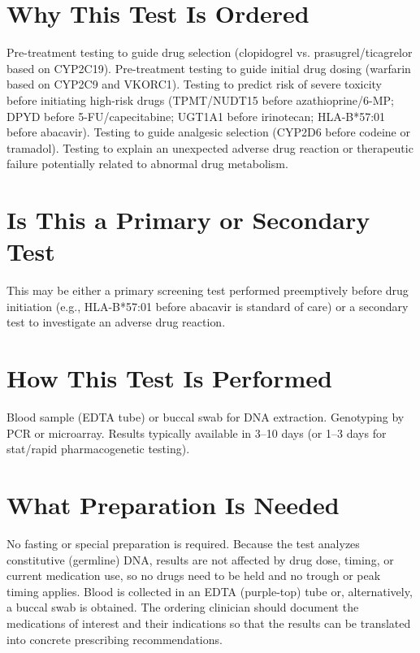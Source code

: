 \section*{Why This Test Is Ordered}
Pre-treatment testing to guide drug selection (clopidogrel vs. prasugrel/ticagrelor based on CYP2C19). Pre-treatment testing to guide initial drug dosing (warfarin based on CYP2C9 and VKORC1). Testing to predict risk of severe toxicity before initiating high-risk drugs (TPMT/NUDT15 before azathioprine/6-MP; DPYD before 5-FU/capecitabine; UGT1A1 before irinotecan; HLA-B*57:01 before abacavir). Testing to guide analgesic selection (CYP2D6 before codeine or tramadol). Testing to explain an unexpected adverse drug reaction or therapeutic failure potentially related to abnormal drug metabolism.

\section*{Is This a Primary or Secondary Test}
This may be either a primary screening test performed preemptively before drug initiation (e.g., HLA-B*57:01 before abacavir is standard of care) or a secondary test to investigate an adverse drug reaction.

\section*{How This Test Is Performed}
Blood sample (EDTA tube) or buccal swab for DNA extraction. Genotyping by PCR or microarray. Results typically available in 3--10 days (or 1--3 days for stat/rapid pharmacogenetic testing).

\section*{What Preparation Is Needed}
No fasting or special preparation is required. Because the test analyzes constitutive (germline) DNA, results are not affected by drug dose, timing, or current medication use, so no drugs need to be held and no trough or peak timing applies. Blood is collected in an EDTA (purple-top) tube or, alternatively, a buccal swab is obtained. The ordering clinician should document the medications of interest and their indications so that the results can be translated into concrete prescribing recommendations.

